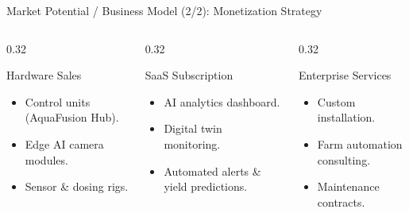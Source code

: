 \documentclass[aspectratio=169, 10pt]{beamer}
\begin{document}
\begin{frame}{Market Potential / Business Model (2/2): Monetization Strategy}
  \begin{columns}[T]
    \begin{column}{0.32\textwidth}
      \begin{block}{Hardware Sales}
        \small
        \begin{itemize}
          \item Control units (AquaFusion Hub).
          \item Edge AI camera modules.
          \item Sensor \& dosing rigs.
        \end{itemize}
      \end{block}
    \end{column}

    \begin{column}{0.32\textwidth}
      \begin{block}{SaaS Subscription}
        \small
        \begin{itemize}
          \item AI analytics dashboard.
          \item Digital twin monitoring.
          \item Automated alerts \& yield predictions.
        \end{itemize}
      \end{block}
    \end{column}

    \begin{column}{0.32\textwidth}
      \begin{block}{Enterprise Services}
        \small
        \begin{itemize}
          \item Custom installation.
          \item Farm automation consulting.
          \item Maintenance contracts.
        \end{itemize}
      \end{block}
    \end{column}
  \end{columns}
\end{frame}
\end{document}
